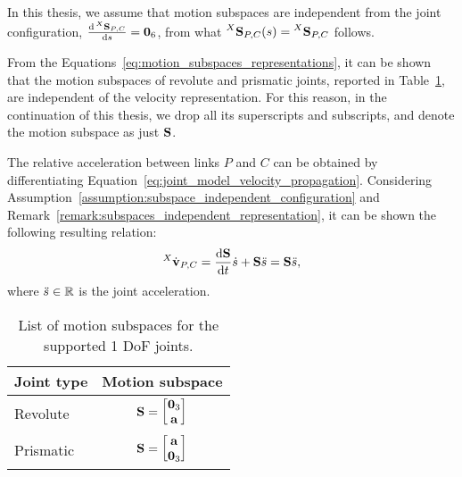 \begin{assumption*}
%
\label{assumption:subspace_independent_configuration}
In this thesis, we assume that motion subspaces are independent from the joint configuration, \ie $\dv{\subspacee[X]_{P,C}}{\shape} = \zeros_6$, from what $\subspacee[X]_{P,C}(\shape) = \subspacee[X]_{P,C}$ follows.
%
\end{assumption*}

\begin{remark}
\label{remark:subspaces_independent_representation}
%
From the Equations~\eqref{eq:motion_subspaces_representations}, it can be shown that the motion subspaces of revolute and prismatic joints, reported in Table~\ref{tab:motion_subspaces}, are independent of the velocity representation.
For this reason, in the continuation of this thesis, we drop all its superscripts and subscripts, and denote the motion subspace as just $\subspace$.
%
\end{remark}

The relative acceleration between links $P$ and $C$ can be obtained by differentiating Equation~\eqref{eq:joint_model_velocity_propagation}.
Considering Assumption~\ref{assumption:subspace_independent_configuration} and Remark~\ref{remark:subspaces_independent_representation}, it can be shown the following resulting relation:
%
\begin{equation}
    \label{eq:joint_model_acceleration_propagation}
    \velsixd[X]_{P,C} 
    = \dv{\subspace}{t} \dot{\shape} + \subspace \ddot{\shape}
    = \subspace \ddot{\shape}
    ,
\end{equation}
%
where $\ddot{s} \in \realn$ is the joint acceleration.

\begin{table}
    \centering
    \begin{tabular}{lc}
        Joint type & Motion subspace \\
        \hline\hline
        \addlinespace[1mm]
        Revolute & $\subspace = \begin{bmatrix}\zeros_3 \\ \mathbf{a}\end{bmatrix}$ \\
        \addlinespace[1mm]
        Prismatic & $\subspace = \begin{bmatrix}\mathbf{a} \\ \zeros_3 \end{bmatrix}$
    \end{tabular}
    \caption{List of motion subspaces for the supported 1 \ac{DoF} joints.}
    \label{tab:motion_subspaces}
\end{table}

